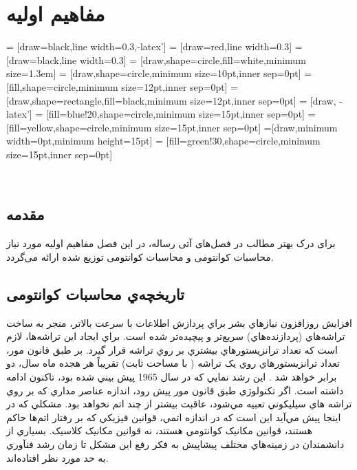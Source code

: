 \chapter{مفاهیم اولیه}

 = [draw=black,line width=0.3,-latex']
 = [draw=red,line width=0.3] 
 = [draw=black,line width=0.3] 
 = [draw,shape=circle,fill=white,minimum size=1.3em] 
  = [draw,shape=circle,minimum size=10pt,inner sep=0pt]
  = [fill,shape=circle,minimum size=12pt,inner sep=0pt]
  = [draw,shape=rectangle,fill=black,minimum size=12pt,inner sep=0pt]
 = [draw, -latex']
 = [fill=blue!20,shape=circle,minimum size=15pt,inner sep=0pt] 
 = [fill=yellow,shape=circle,minimum size=15pt,inner sep=0pt]
=[draw,minimum width=0pt,minimum height=15pt]
 = [fill=green!30,shape=circle,minimum size=15pt,inner sep=0pt]



\newpage
‎\renewcommand{\baselinestretch}{2}\normalsize‎


\label{basicconcepts}
\section{مقدمه}

برای درک بهتر مطالب در فصل‌های آتی رساله، در این فصل مفاهیم اولیه مورد نیاز محاسبات کوانتومی و محاسبات کوانتومی توزیع شده ارائه می‌گردد. 
\section{تاریخچه‌ي محاسبات کوانتومی}

افزايش روزافزون نيازهاي بشر براي پردازش اطلاعات با سرعت بالاتر، منجر به ساخت تراشه‌هاي (پردازنده‌هاي) سريع‌تر و پيچيده‌تر شده است. براي ايجاد اين تراشه‌ها، لازم است که تعداد ترانزيستورهاي بيشتري بر روي تراشه قرار گیرد. بر طبق قانون مور، تعداد ترانزيستورهاي روي يک تراشه ( با مساحت ثابت) تقريباً هر هجده ماه سال، دو برابر خواهد شد \cite{moore1965cramming}. اين رشد نمايي که در سال 1965 پيش بيني شده بود، تاکنون ادامه داشته است. اگر تکنولوژي طبق قانون مور پیش رود، اندازه عناصر مداري که بر روي تراشه هاي سيليکوني تعبيه مي‌شود، عاقبت بيشتر از چند اتم نخواهد بود. مشکلي که در اينجا پيش مي‌آيد اين است که در اندازه اتمي، قوانين فيزيکي که بر رفتار اتم‌ها حاکم هستند، قوانين مکانيک کوانتومي هستند، نه قوانين مکانيک کلاسيک. بسياري از دانشمندان در زمينه‌هاي مختلف پيشاپيش به فكر رفع اين مشكل تا زمان رشد فنآوري به حد مورد نظر افتاده‌اند. 

